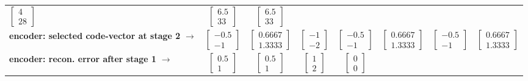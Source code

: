 \begin{table}[t]
\begin{tabular}{|l||c|c|c|c|c|c|c|}
$\left[\begin{array}{c}4 \\28\end{array}\right]$   				&  
$\left[\begin{array}{c}6.5 \\33\end{array}\right]$     			&	 
$\left[\begin{array}{c}6.5 \\33\end{array}\right]$ 				\\
\textbf{encoder: selected code-vector at stage 2} $\rightarrow$	& 
$\left[\begin{array}{c}-0.5 \\-1\end{array}\right]$     			&  
$\left[\begin{array}{c}0.6667 \\1.3333\end{array}\right]$		&  
$\left[\begin{array}{c}-1 \\-2\end{array}\right]$   				&	  
$\left[\begin{array}{c}-0.5 \\-1\end{array}\right]$   				&  
$\left[\begin{array}{c}0.6667 \\1.3333\end{array}\right]$   		&  
$\left[\begin{array}{c}-0.5 \\-1\end{array}\right]$     			& 
$\left[\begin{array}{c}0.6667 \\1.3333\end{array}\right]$ 		\\
\hline
\textbf{encoder: recon. error after stage 1} $\rightarrow$		&
$\left[\begin{array}{c}0.5 \\1\end{array}\right]$     				&  
$\left[\begin{array}{c}0.5\\1\end{array}\right]$					&  
$\left[\begin{array}{c}1 \\2\end{array}\right]$   					&  
$\left[\begin{array}{c}0\\0\end{array}\right]$   					&  

\end{tabular}
\end{table}
